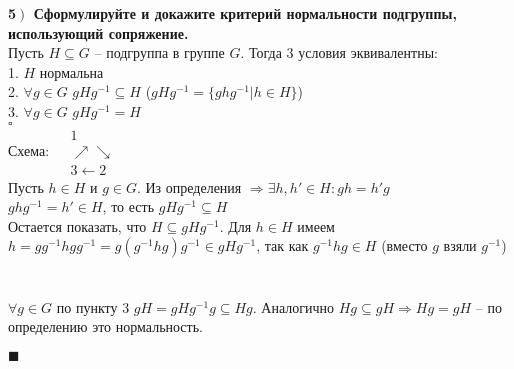 \documentclass[a4paper,12pt]{article}
\begin{document}
    \textbf{5$\left.\right)$ Сформулируйте и докажите критерий нормальности подгруппы, использующий сопряжение.}\\Пусть $H\subseteq G$ -- подгруппа в группе $G$. Тогда 3 условия эквивалентны:\\
    1. $H$ нормальна\\
    2. $\forall g\in G$ $gHg^{-1}\subseteq H$ ($gHg^{-1}=\{ghg^{-1}|h\in H \}$)\\
    3. $\forall g\in G$ $gHg^{-1}=H$\\
    $\square$\\
    Схема:  $\begin{matrix}
                 & 1                & \\
                 & \nearrow\searrow & \\
                 & 3\leftarrow2     &
    \end{matrix}\
    $\\
     Пусть $h\in H$ и $g\in G$. Из определения $\Rightarrow\exists h, h'\in H:gh=h'g$\\
    $ghg^{-1}=h'\in H$, то есть $gHg^{-1}\subseteq H$\\
     Остается показать, что $H\subseteq gHg^{-1}$. Для $h\in H$ имеем $h=gg^{-1}hgg^{-1}=g(g^{-1}hg)g^{-1}\in gHg^{-1}$, так как $g^{-1}hg\in H$ (вместо $g$ взяли $g^{-1}$)\\ \\ \\
    \fbox{$3\rightarrow1$} $\forall g\in G$ по пункту 3 $gH=gHg^{-1}g\subseteq Hg$. Аналогично $Hg\subseteq gH\Rightarrow Hg=gH$ -- по определению это нормальность.
    \begin{flushright}
        $\blacksquare$
    \end{flushright}
\end{document}
